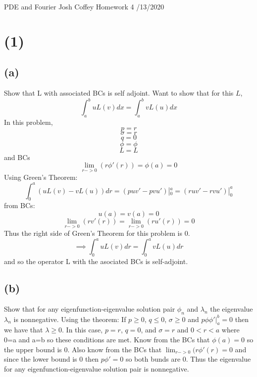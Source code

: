 \documentclass[preview,12pt]{article}
\begin{document}
\noindent PDE and Fourier\newline
Josh Coffey \newline
Homework 4 /13/2020 \newline

\section*{(1)}

    \subsection*{(a)}
        Show that L with associated BCs is self adjoint. \newline
        Want to show that for this $L$,
        $$\int_a^b uL(v)dx=\int_a^b vL(u)dx$$
        In this problem,
        $$p=r$$
        $$\sigma=r$$
        $$q=0$$
        $$\phi=\phi$$
        $$L=L$$
        and BCs
        $$\lim_{r->0}(r\phi '(r))=\phi(a)=0$$
        Using Green's Theorem:
        $$\int_0^a (uL(v)-vL(u))dr=(puv'-pvu')|_0^a=(ruv'-rvu')|_0^a$$
        from BCs:
        $$u(a)=v(a)=0$$
        $$\lim_{r->0}(rv '(r))=\lim_{r->0}(ru '(r))=0$$
        Thus the right side of Green's Theorem for this problem is 0.
        $$\implies \int_0^a uL(v)dr=\int_0^avL(u)dr$$
        and so the operator L with the asociated BCs is self-adjoint.
        
    \subsection*{(b)}
        Show that for any eigenfunction-eigenvalue solution pair $\phi_n$ and $\lambda_n$ the eigenvalue $\lambda_n$ is nonnegative. \newline
        Using the theorem: If $p\geq 0$, $q\leq 0$, $\sigma \geq 0$ and $p\phi\phi '|_a^b=0$
        then we have that $\lambda \geq 0$. \newline
        In this case, $p=r$, $q=0$, and $\sigma = r$ and $0<r<a$ where 0=a and a=b so these conditions are met.  \newline
        Know from the BCs that $\phi(a)=0$ so the upper bound is 0. \newline
        Also know from the BCs that $\lim_{r->0}(r\phi ' (r)=0$ and since the lower bound is 0 then $p\phi ' =0$ so both bunds are 0. \newline
        Thus the eigenvalue for any eigenfunction-eigenvalue solution pair is nonnegative. 
        
\end{document}
